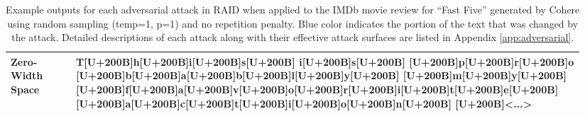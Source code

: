 \documentclass[11pt]{article}
\begin{document}
\begin{table}
\begin{tabular}{p{0.11\linewidth}|p{0.83\linewidth}}
\midrule
\textbf{Zero-Width Space}&T{\color{blue}[U+200B]}h{\color{blue}[U+200B]}i{\color{blue}[U+200B]}s{\color{blue}[U+200B]} i{\color{blue}[U+200B]}s{\color{blue}[U+200B]} {\color{blue}[U+200B]}p{\color{blue}[U+200B]}r{\color{blue}[U+200B]}o {\color{blue}[U+200B]}b{\color{blue}[U+200B]}a{\color{blue}[U+200B]}b{\color{blue}[U+200B]}l{\color{blue}[U+200B]}y{\color{blue}[U+200B]} {\color{blue}[U+200B]}m{\color{blue}[U+200B]}y{\color{blue}[U+200B]} {\color{blue}[U+200B]}f{\color{blue}[U+200B]}a{\color{blue}[U+200B]}v{\color{blue}[U+200B]}o{\color{blue}[U+200B]}r{\color{blue}[U+200B]}i{\color{blue}[U+200B]}t{\color{blue}[U+200B]}e{\color{blue}[U+200B]} {\color{blue}[U+200B]}a{\color{blue}[U+200B]}c{\color{blue}[U+200B]}t{\color{blue}[U+200B]}i{\color{blue}[U+200B]}o{\color{blue}[U+200B]}n{\color{blue}[U+200B]} {\color{blue}[U+200B]}<...>\\
\bottomrule
\end{tabular}
\caption{Example outputs for each adversarial attack in RAID when applied to the IMDb movie review for ``Fast Five'' generated by Cohere using random sampling (temp=1, p=1) and no repetition penalty. Blue color indicates the portion of the text that was changed by the attack. Detailed descriptions of each attack along with their effective attack surfaces are listed in Appendix \ref{app:adversarial}.}
\label{tab:adversarial_attack_examples}
\end{table}
\end{document}
